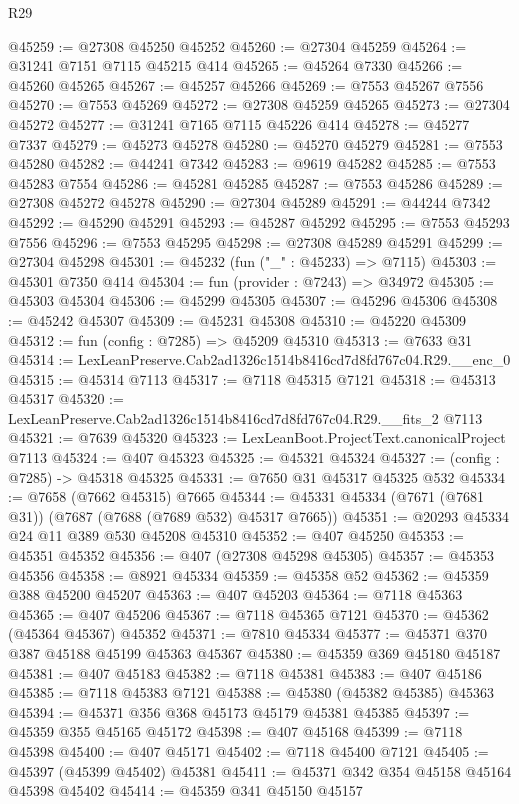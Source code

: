 \begin{lexlean}{R29}
\begin{coremodule}
@45259 := @27308 @45250 @45252
@45260 := @27304 @45259
@45264 := @31241 @7151 @7115 @45215 @414
@45265 := @45264 @7330
@45266 := @45260 @45265
@45267 := @45257 @45266
@45269 := @7553 @45267 @7556
@45270 := @7553 @45269
@45272 := @27308 @45259 @45265
@45273 := @27304 @45272
@45277 := @31241 @7165 @7115 @45226 @414
@45278 := @45277 @7337
@45279 := @45273 @45278
@45280 := @45270 @45279
@45281 := @7553 @45280
@45282 := @44241 @7342
@45283 := @9619 @45282
@45285 := @7553 @45283 @7554
@45286 := @45281 @45285
@45287 := @7553 @45286
@45289 := @27308 @45272 @45278
@45290 := @27304 @45289
@45291 := @44244 @7342
@45292 := @45290 @45291
@45293 := @45287 @45292
@45295 := @7553 @45293 @7556
@45296 := @7553 @45295
@45298 := @27308 @45289 @45291
@45299 := @27304 @45298
@45301 := @45232 (fun ("_" : @45233) => @7115)
@45303 := @45301 @7350 @414
@45304 := fun (provider : @7243) => @34972
@45305 := @45303 @45304
@45306 := @45299 @45305
@45307 := @45296 @45306
@45308 := @45242 @45307
@45309 := @45231 @45308
@45310 := @45220 @45309
@45312 := fun (config : @7285) => @45209 @45310
@45313 := @7633 @31
@45314 := LexLeanPreserve.Cab2ad1326c1514b8416cd7d8fd767c04.R29.__enc_0
@45315 := @45314 @7113
@45317 := @7118 @45315 @7121
@45318 := @45313 @45317
@45320 := LexLeanPreserve.Cab2ad1326c1514b8416cd7d8fd767c04.R29.__fits_2 @7113
@45321 := @7639 @45320
@45323 := LexLeanBoot.ProjectText.canonicalProject @7113
@45324 := @407 @45323
@45325 := @45321 @45324
@45327 := (config : @7285) -> @45318 @45325
@45331 := @7650 @31 @45317 @45325 @532
@45334 := @7658 (@7662 @45315) @7665
@45344 := @45331 @45334 (@7671 (@7681 @31)) (@7687 (@7688 (@7689 @532) @45317 @7665))
@45351 := @20293 @45334 @24 @11 @389 @530 @45208 @45310
@45352 := @407 @45250
@45353 := @45351 @45352
@45356 := @407 (@27308 @45298 @45305)
@45357 := @45353 @45356
@45358 := @8921 @45334
@45359 := @45358 @52
@45362 := @45359 @388 @45200 @45207
@45363 := @407 @45203
@45364 := @7118 @45363
@45365 := @407 @45206
@45367 := @7118 @45365 @7121
@45370 := @45362 (@45364 @45367) @45352
@45371 := @7810 @45334
@45377 := @45371 @370 @387 @45188 @45199 @45363 @45367
@45380 := @45359 @369 @45180 @45187
@45381 := @407 @45183
@45382 := @7118 @45381
@45383 := @407 @45186
@45385 := @7118 @45383 @7121
@45388 := @45380 (@45382 @45385) @45363
@45394 := @45371 @356 @368 @45173 @45179 @45381 @45385
@45397 := @45359 @355 @45165 @45172
@45398 := @407 @45168
@45399 := @7118 @45398
@45400 := @407 @45171
@45402 := @7118 @45400 @7121
@45405 := @45397 (@45399 @45402) @45381
@45411 := @45371 @342 @354 @45158 @45164 @45398 @45402
@45414 := @45359 @341 @45150 @45157

\end{coremodule}
\end{lexlean}
